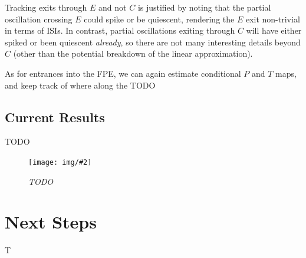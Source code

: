 \documentclass[letterpaper,12pt]{article}
\numberwithin{table}{section}
\numberwithin{figure}{section}
\numberwithin{equation}{section}
\newcommand{\centerfig}[2]{\begin{center}\texttt{[image: img/\#2]}\end{center}}
\newcommand{\ccaption}[1]{\caption{\textit{#1}}}
\begin{document}
\begin{flushleft}
    Tracking exits through $E$ and not $C$ is justified by noting that the partial oscillation crossing $E$ could spike or be quiescent, rendering the $E$ exit non-trivial in terms of ISIs. In contrast, partial oscillations exiting through $C$ will have either spiked or been quiescent \textit{already}, so there are not many interesting details beyond $C$ (other than the potential breakdown of the linear approximation).

    As for entrances into the FPE, we can again estimate conditional $P$ and $T$ maps, and keep track of where along the TODO

    \subsection{Current Results}
    TODO

    \begin{figure}[h]

        \centering
 
        \centerfig{0.8}{off-dist.jpg}
    
        \captionsetup{width=0.8\linewidth}
        \ccaption{TODO}
        \label{fig:off-dist}
    
    \end{figure}

    


    \pagebreak

    \section{Next Steps}
    T

    \pagebreak

    
    

\end{flushleft}
\end{document}
